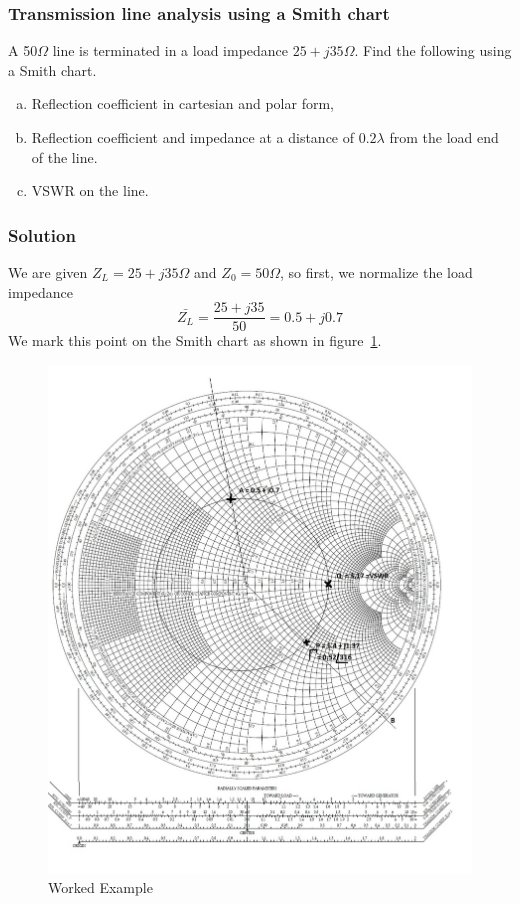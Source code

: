 \begin{exmp}
\subsubsection*{Transmission line analysis using a Smith chart}
A 50$\Omega$ line is terminated in a load impedance $25+j35\Omega$. Find the following using a Smith chart.
\begin{enumerate}[(a)]
\item Reflection coefficient in cartesian and polar form,
\item Reflection coefficient and impedance at a distance of $0.2\lambda$ from the load end of the line.
\item VSWR on the line.
\end{enumerate}

\subsubsection*{Solution}
We are given $Z_{L}=25+j35\varOmega$ and $Z_{0}=50\varOmega$, so first, we normalize the load impedance
\begin{dmath*}
\bar{Z_{L}}=\frac{25+j35}{50}=0.5+j0.7
\end{dmath*}
We mark this point on the Smith chart as shown in figure~\ref{fig:workedexample2}.
\begin{figure}[h]
\centering
\includegraphics[width=1\linewidth]{"./graphics/Smith chart 1"}
\caption{Worked Example}
\label{fig:workedexample2}
\end{figure}


\end{exmp}

